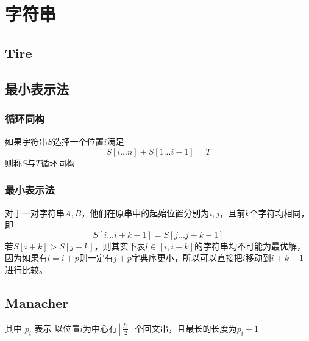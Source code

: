 \chapter{字符串}






\section{Tire}




\section{最小表示法}

\subsection{循环同构}
如果字符串$S$选择一个位置$i$满足
$$
S[i...n]+S[1...i-1] = T
$$
则称$S$与$T$循环同构

\subsection{最小表示法}
对于一对字符串$A,B$，他们在原串中的起始位置分别为$i,j$，且前$k$个字符均相同，即
$$
S[i...i+k-1] =S[j...j+k-1]
$$
若$S[i+k]>S[j+k]$，则其实下表$l\in[i,i+k]$的字符串均不可能为最优解，因为如果有$l=i+p$则一定有$j+p$字典序更小，所以可以直接把$i$移动到$i+k+1$进行比较。



\section{Manacher}

其中 $p_i$ 表示 以位置$i$为中心有$\left \lfloor \frac{p_i}{2} \right \rfloor $个回文串，且最长的长度为$p_i-1$

